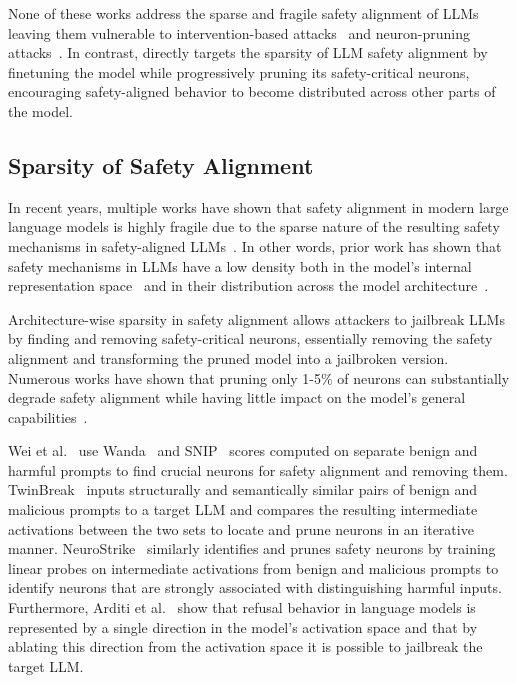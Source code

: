 None of these works address the sparse and fragile safety alignment of LLMs leaving them vulnerable to intervention-based attacks~\cite{arditi2024refusal} and neuron-pruning attacks~\cite{wu2026neurostrike, twinbreak}. In contrast, \method directly targets the sparsity of LLM safety alignment by finetuning the model while progressively pruning its safety-critical neurons, encouraging safety-aligned behavior to become distributed across other parts of the model.



\subsection{Sparsity of Safety Alignment}
\label{subsec:related_work:safety_alignment}



In recent years, multiple works have shown that safety alignment in modern large language models is highly fragile due to the sparse nature of the resulting safety mechanisms in safety-aligned LLMs~\cite{arditi2024refusal, twinbreak,wu2026neurostrike,wei2024brittleness}. In other words, prior work has shown that safety mechanisms in LLMs have a low density both in the model's internal representation space~\cite{arditi2024refusal} and in their distribution across the model architecture~\cite{twinbreak, wu2026neurostrike, wei2024brittleness}.

Architecture-wise sparsity in safety alignment allows attackers to jailbreak LLMs by finding and removing safety-critical neurons, essentially removing the safety alignment and transforming the pruned model into a jailbroken version. Numerous works have shown that pruning only 1-5\% of neurons can substantially degrade safety alignment while having little impact on the model's general capabilities~\cite{twinbreak, wei2024brittleness, wu2026neurostrike}.

Wei et al.~\cite{wei2024brittleness} use Wanda~\cite{sun2024wanda} and SNIP~\cite{lee2018snip} scores computed on separate benign and harmful prompts to find crucial neurons for safety alignment and removing them. TwinBreak~\cite{twinbreak} inputs structurally and semantically similar pairs of benign and malicious prompts to a target LLM and compares the resulting intermediate activations between the two sets to locate and prune neurons in an iterative manner. NeuroStrike~\cite{wu2026neurostrike} similarly identifies and prunes safety neurons by training linear probes on intermediate activations from benign and malicious prompts to identify neurons that are strongly associated with distinguishing harmful inputs. Furthermore, Arditi et al.~\cite{arditi2024refusal} show that refusal behavior in language models is represented by a single direction in the model's activation space and that by ablating this direction from the activation space it is possible to jailbreak the target LLM.

